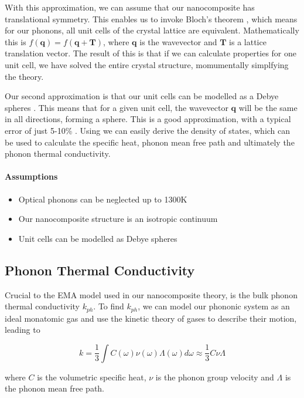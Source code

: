 \documentclass[12pt]{article}
\renewcommand{\vec}[1]{\mathbf{#1}}
\begin{document}
With this approximation, we can assume that our nanocomposite has translational symmetry. This enables us to invoke Bloch's theorem \cite{kittel}, which means for our phonons, all unit cells of the crystal lattice are equivalent. Mathematically this is $f(\vec{q}) = f(\vec{q} + \vec{T})$, where $\vec{q}$ is the wavevector and $\vec{T}$ is a lattice translation vector. The result of this is that if we can calculate properties for one unit cell, we have solved the entire crystal structure, momumentally simplfying the theory.

Our second approximation is that our unit cells can be modelled as a Debye spheres \cite{kittel}. This means that for a given unit cell, the wavevector $\vec{q}$ will be the same in all directions, forming a sphere. This is a good approximation, with a typical error of just 5-10\% \cite{gp}. Using we can easily derive the density of states, which can be used to calculate the specific heat, phonon mean free path and ultimately the phonon thermal conductivity.

\paragraph{Assumptions}
\begin{itemize}
  \item Optical phonons can be neglected up to 1300K
  \item Our nanocomposite structure is an isotropic continuum
  \item Unit cells can be modelled as Debye spheres
\end{itemize}

\subsection{Phonon Thermal Conductivity}
\label{sec:phonon-thermal}
Crucial to the EMA model \cite{ema} used in our nanocomposite theory, is the bulk phonon thermal conductivity $k_{ph}$. To find $k_{ph}$, we can model our phononic system as an ideal monatomic gas and use the kinetic theory of gases to describe their motion, leading to \cite{kittel}

\begin{equation}
\label{eq:phonon-thermal}
	k = \frac{1}{3} \int C(\omega) \nu(\omega) \Lambda (\omega) d\omega \approx \frac{1}{3}C\nu\Lambda
\end{equation}

where $C$ is the volumetric specific heat, $\nu$ is the phonon group velocity and $\Lambda$ is the phonon mean free path.
\end{document}
